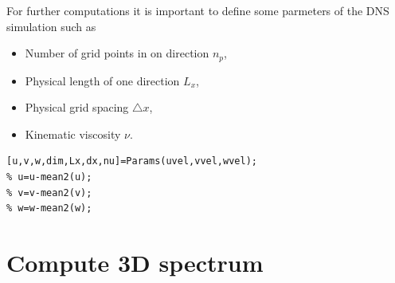 \documentclass[preprint,12pt,ntfdMod]{elsarticle}
\begin{document}
\begin{par}

For further computations it is important to define some parmeters of the
DNS simulation such as
\begin{itemize}
  \item Number of grid points in on direction $n_{p}$,
  \item Physical length of one direction $L_x$,
  \item Physical grid spacing $\triangle x$,
  \item Kinematic viscosity $\nu$.
\end{itemize}

\end{par} \vspace{1em}
\begin{verbatim}
[u,v,w,dim,Lx,dx,nu]=Params(uvel,vvel,wvel);
% u=u-mean2(u);
% v=v-mean2(v);
% w=w-mean2(w);
\end{verbatim}
\begin{par}



\end{par} \vspace{1em}


\section{Compute 3D spectrum}
\end{document}
